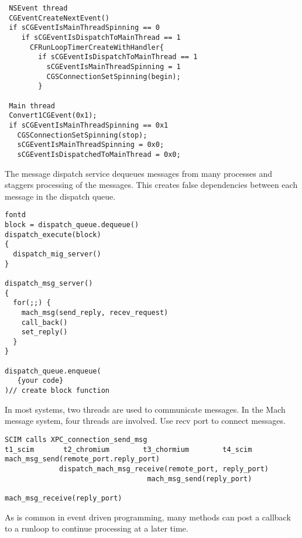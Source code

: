 {\footnotesize \begin{verbatim}
 NSEvent thread                     
 CGEventCreateNextEvent()
 if sCGEventIsMainThreadSpinning == 0
    if sCGEventIsDispatchToMainThread == 1
      CFRunLoopTimerCreateWithHandler{
        if sCGEventIsDispatchToMainThread == 1
          sCGEventIsMainThreadSpinning = 1
          CGSConnectionSetSpinning(begin);      
        }

 Main thread
 Convert1CGEvent(0x1);
 if sCGEventIsMainThreadSpinning == 0x1
   CGSConnectionSetSpinning(stop);
   sCGEventIsMainThreadSpinning = 0x0;
   sCGEventIsDispatchedToMainThread = 0x0;

\end{verbatim}
}

The message dispatch service dequeues messages from many processes and staggers
processing of the messages. This creates false dependencies between each
message in the dispatch queue.
{\footnotesize \begin{verbatim}
fontd
block = dispatch_queue.dequeue()
dispatch_execute(block)
{
  dispatch_mig_server()
}

dispatch_msg_server()
{
  for(;;) {
    mach_msg(send_reply, recev_request)
    call_back()
    set_reply()
  }
}

dispatch_queue.enqueue(
   {your code}
)// create block function
\end{verbatim}
}

In most systems, two threads are used to communicate messages.
In the Mach message system, four threads are involved.
Use recv port to connect messages.

{\footnotesize \begin{verbatim}
SCIM calls XPC_connection_send_msg
t1_scim       t2_chromium        t3_chormium        t4_scim
mach_msg_send(remote_port.reply_port)
             dispatch_mach_msg_receive(remote_port, reply_port)
                                  mach_msg_send(reply_port)
                                                    mach_msg_receive(reply_port)
\end{verbatim}
}

As is common in event driven programming, many methods can post a callback to a runloop to continue processing at a later time.

